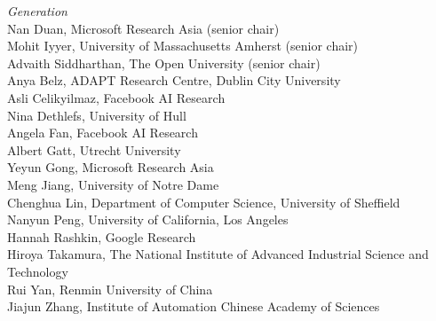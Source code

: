 \emph{Generation} \\
\hspace*{0.2in} Nan Duan, Microsoft Research Asia (senior chair)\\
\hspace*{0.2in} Mohit Iyyer, University of Massachusetts Amherst (senior chair)\\
\hspace*{0.2in} Advaith Siddharthan, The Open University (senior chair)\\
\hspace*{0.2in} Anya Belz, ADAPT Research Centre, Dublin City University\\
\hspace*{0.2in} Asli Celikyilmaz, Facebook AI Research\\
\hspace*{0.2in} Nina Dethlefs, University of Hull\\
\hspace*{0.2in} Angela Fan, Facebook AI Research\\
\hspace*{0.2in} Albert Gatt, Utrecht University\\
\hspace*{0.2in} Yeyun Gong, Microsoft Research Asia\\
\hspace*{0.2in} Meng Jiang, University of Notre Dame\\
\hspace*{0.2in} Chenghua Lin, Department of Computer Science, University of Sheffield \\
\hspace*{0.2in} Nanyun Peng, University of California, Los Angeles\\
\hspace*{0.2in} Hannah Rashkin, Google Research\\
\hspace*{0.2in} Hiroya Takamura, The National Institute of Advanced Industrial Science and Technology\\
\hspace*{0.2in} Rui Yan, Renmin University of China\\
\hspace*{0.2in} Jiajun Zhang, Institute of Automation Chinese Academy of Sciences\\

